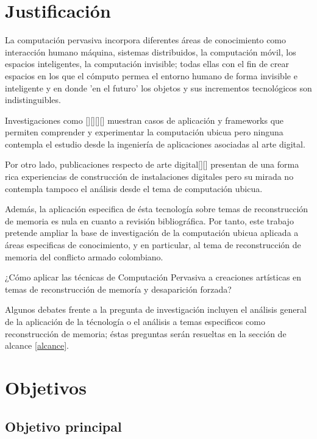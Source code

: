 \section{Justificación}
\label{justificacion}

La computación pervasiva incorpora diferentes áreas de conocimiento como interacción humano máquina, sistemas distribuidos, la computación móvil, los espacios inteligentes, la computación invisible; todas ellas con el fin de crear espacios en los que el cómputo permea el entorno humano de forma invisible e inteligente y en donde 'en el futuro' los objetos y sus incrementos tecnológicos son indistinguibles. \cite{}


Investigaciones como [][][][] muestran casos de aplicación y frameworks que permiten comprender y experimentar la computación ubicua pero ninguna contempla el estudio desde la ingeniería de aplicaciones asociadas al arte digital.




Por otro lado, publicaciones respecto de arte digital[][] presentan de una forma rica experiencias de construcción de instalaciones digitales pero su mirada no contempla tampoco el análisis desde el tema de computación ubicua.

Además, la aplicación especifica de ésta tecnología sobre temas de reconstrucción de memoria es nula en cuanto a revisión bibliográfica. Por tanto, este trabajo pretende ampliar la base de investigación de la computación ubicua aplicada a áreas especificas de conocimiento, y en particular, al tema de reconstrucción de memoria del conflicto armado colombiano.

¿Cómo aplicar las técnicas de Computación Pervasiva a creaciones artísticas en temas de reconstrucción de memoría y desaparición forzada?

Algunos debates frente a la pregunta de investigación incluyen el análisis general de la aplicación de la técnología o el análisis a temas especificos como reconstrucción de memoria; éstas preguntas serán resueltas en la sección de alcance \ref{alcance}.

\section{Objetivos}

\subsection{Objetivo principal}

